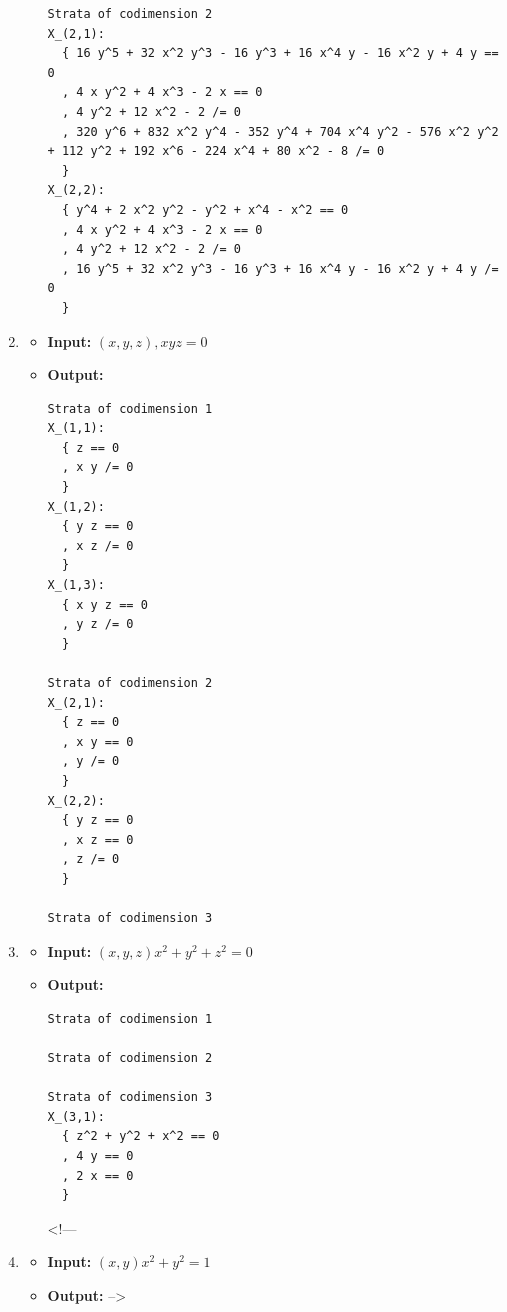 \documentclass[
]{book}
\theoremstyle{definition}
\theoremstyle{definition}
\theoremstyle{definition}
\theoremstyle{definition}
\theoremstyle{remark}
\begin{document}
\begin{enumerate}
\begin{itemize}
\begin{verbatim}
Strata of codimension 2
X_(2,1):
  { 16 y^5 + 32 x^2 y^3 - 16 y^3 + 16 x^4 y - 16 x^2 y + 4 y == 0
  , 4 x y^2 + 4 x^3 - 2 x == 0
  , 4 y^2 + 12 x^2 - 2 /= 0
  , 320 y^6 + 832 x^2 y^4 - 352 y^4 + 704 x^4 y^2 - 576 x^2 y^2 + 112 y^2 + 192 x^6 - 224 x^4 + 80 x^2 - 8 /= 0
  }
X_(2,2):
  { y^4 + 2 x^2 y^2 - y^2 + x^4 - x^2 == 0
  , 4 x y^2 + 4 x^3 - 2 x == 0
  , 4 y^2 + 12 x^2 - 2 /= 0
  , 16 y^5 + 32 x^2 y^3 - 16 y^3 + 16 x^4 y - 16 x^2 y + 4 y /= 0
  }
\end{verbatim}
  \end{itemize}
\item
  \begin{itemize}
  \item
    \textbf{Input:} \((x,y,z), x y z = 0\)
  \item
    \textbf{Output:}

\begin{verbatim}
Strata of codimension 1
X_(1,1):
  { z == 0
  , x y /= 0
  }
X_(1,2):
  { y z == 0
  , x z /= 0
  }
X_(1,3):
  { x y z == 0
  , y z /= 0
  }

Strata of codimension 2
X_(2,1):
  { z == 0
  , x y == 0
  , y /= 0
  }
X_(2,2):
  { y z == 0
  , x z == 0
  , z /= 0
  }

Strata of codimension 3
\end{verbatim}
  \end{itemize}
\item
  \begin{itemize}
  \item
    \textbf{Input:} \((x,y,z) x^2 + y^2 + z^2 = 0\)
  \item
    \textbf{Output:}

\begin{verbatim}
Strata of codimension 1

Strata of codimension 2

Strata of codimension 3
X_(3,1):
  { z^2 + y^2 + x^2 == 0
  , 4 y == 0
  , 2 x == 0
  }
\end{verbatim}

    \textless!---
  \end{itemize}
\item
  \begin{itemize}
  \item
    \textbf{Input:} \((x,y) x^2 + y^2 = 1\)
  \item
    \textbf{Output:}
    --\textgreater{}
  \end{itemize}
\end{enumerate}
\end{document}
